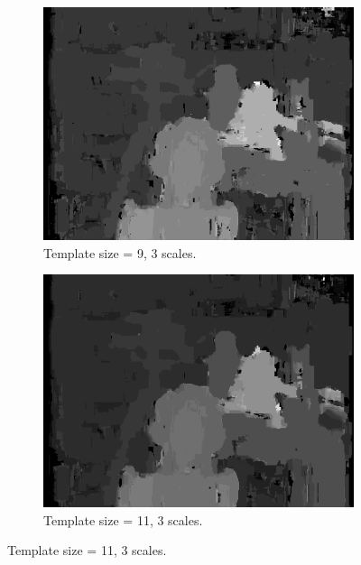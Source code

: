 \documentclass[12pt,a4paper,oneside,final]{article}
\begin{document}
\begin{figure}[H]
\begin{subfigure}[b]{0.24\textwidth}
	\includegraphics[width=\textwidth]{disparity_s3_k9.png}
	\caption{Template size = 9, 3 scales.}
\end{subfigure}
\begin{subfigure}[b]{0.24\textwidth}
	\includegraphics[width=\textwidth]{disparity_s3_k11.png}
	\caption{Template size = 11, 3 scales.}
\end{subfigure}
\end{figure}
\end{document}
